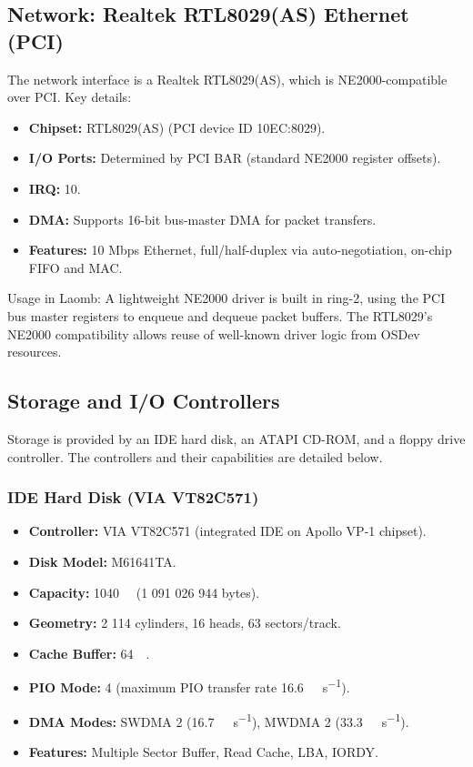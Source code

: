 \documentclass[12pt,a4paper]{report}
\begin{document}
	\subsection{Network: Realtek RTL8029(AS) Ethernet (PCI)}
	\label{sec:network}
	
	The network interface is a Realtek RTL8029(AS), which is NE2000-compatible over PCI. Key details:
	
	\begin{itemize}
		\item \textbf{Chipset:} RTL8029(AS) (PCI device ID 10EC:8029).
		\item \textbf{I/O Ports:} Determined by PCI BAR (standard NE2000 register offsets).
		\item \textbf{IRQ:} 10.
		\item \textbf{DMA:} Supports 16-bit bus-master DMA for packet transfers.
		\item \textbf{Features:} 10 Mbps Ethernet, full/half-duplex via auto-negotiation, on-chip FIFO and MAC.
	\end{itemize}
	
	Usage in Laomb: A lightweight NE2000 driver is built in ring-2, using the PCI bus master registers to enqueue and dequeue packet buffers. The RTL8029's NE2000 compatibility allows reuse of well-known driver logic from OSDev resources.
	
	\subsection{Storage and I/O Controllers}
	\label{sec:storage-io}
	
	Storage is provided by an IDE hard disk, an ATAPI CD-ROM, and a floppy drive controller. The controllers and their capabilities are detailed below.
	
	\subsubsection{IDE Hard Disk (VIA VT82C571)}
	\begin{itemize}
		\item \textbf{Controller:} VIA VT82C571 (integrated IDE on Apollo VP-1 chipset).
		\item \textbf{Disk Model:} M61641TA.
		\item \textbf{Capacity:} \SI{1040}{\mebi\byte} (1 091 026 944 bytes).
		\item \textbf{Geometry:} 2 114 cylinders, 16 heads, 63 sectors/track.
		\item \textbf{Cache Buffer:} \SI{64}{\kibi\byte}.
		\item \textbf{PIO Mode:} 4 (maximum PIO transfer rate \SI{16.6}{\mebi\byte\per\second}).
		\item \textbf{DMA Modes:} SWDMA 2 (\SI{16.7}{\mebi\byte\per\second}), MWDMA 2 (\SI{33.3}{\mebi\byte\per\second}).
		\item \textbf{Features:} Multiple Sector Buffer, Read Cache, LBA, IORDY.
	\end{itemize}
	
\end{document}
